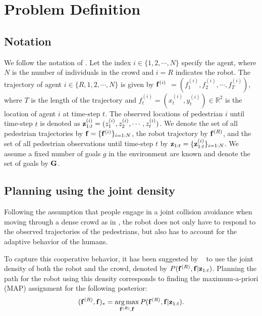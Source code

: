 \section{Problem Definition}
\label{sec:oigp-problem-definition}

\subsection{Notation}
\label{sec:oigp-notation}

We follow the notation of \cite{trautman10}.
Let the index $i \in \{1,2,\cdots,N\}$ specify the agent, where $N$ is the number of individuals in the crowd and $i=R$ indicates the robot. 
The trajectory of agent $i \in \{R,1,2,\cdots,N\}$ is given by $\mathbf{f}^{(i)}$ $= (f_1^{(i)}, f_2^{(i)}, \cdots, f_T^{(i)})$, where $T$ is the length of the trajectory and $f_t^{(i)} = (x_t^{(i)}, y_t^{(i)}) \in \mathbb{R}^2$ is the location of agent $i$ at time-step $t$. The observed locations of pedestrian $i$ until time-step $t$ is denoted as $\mathbf{z}^{(i)}_{1:t} = (z_1^{(i)}, z_2^{(i)}, \cdots, z_t^{(i)})$.  We denote the set of all pedestrian trajectories by $\mathbf{f}=\{\mathbf{f}^{(i)}\}_{i=1:N}$, the robot trajectory by $\mathbf{f}^{(R)}$, and the set of all pedestrian observations until time-step $t$ by $\mathbf{z}_{1:t} = \{\mathbf{z}^{(i)}_{1:t}\}_{i=1:N}$. We assume a fixed number of goals $g$ in the environment are known and denote the set of goals by $\mathbf{G}$. %

\subsection{Planning using the joint density}
\label{sec:oigp-planning}
%
%
%
%
Following the assumption that people engage in a joint collision
avoidance when moving through a dense crowd
 as in \cite{helbing95,trautman10},
the robot does not only have to respond to the observed trajectories
of the pedestrians, but also has to account for the adaptive behavior
of the humans.

To capture this cooperative behavior, it has been suggested by
~\cite{trautman10} to use the joint density of both the robot and the
crowd, denoted by $P(\mathbf{f}^{(R)}, \mathbf{f}|\mathbf{z}_{1:t})$.
%
%
%
%
%
Planning the path for the robot using this density corresponds to
finding the maximum-a-priori (MAP) assignment for the following
posterior:
\begin{equation}
  \label{eq:oigp-8}
  (\mathbf{f}^{(R)}, \mathbf{f})_* = \operatorname*{arg\,max}_{\mathbf{f}^{(R)}, \mathbf{f}} P(\mathbf{f}^{(R)}, \mathbf{f}|\mathbf{z}_{1:t}).
\end{equation}

